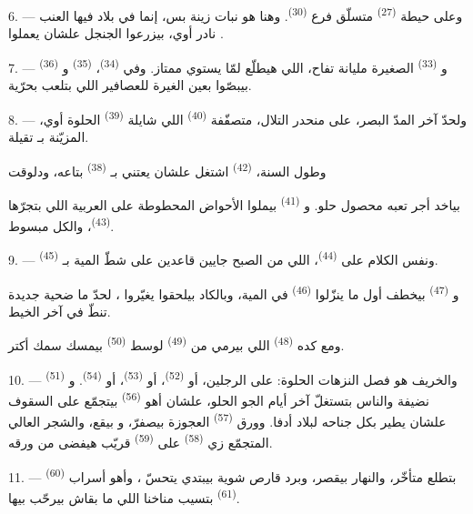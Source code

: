 \VUsaut{6.0mm}
\VUsaut{3.4mm}

6. --- وعلى حيطة  \textsuperscript{(27)} متسلّق فرع 
\textsuperscript{(30)}. وهنا هو نبات زينة بس، إنما في بلاد فيها العنب نادر أوي،
بيزرعوا الجنجل علشان يعملوا .

7. --- و \textsuperscript{(33)} الصغيرة مليانة تفاح، اللي هيطلّع
لمّا يستوي  ممتاز. وفي  \textsuperscript{(34)}،
 \textsuperscript{(35)} و \textsuperscript{(36)}
بيبصّوا بعين الغيرة للعصافير اللي بتلعب بحرّية.

8. --- ولحدّ آخر المدّ البصر، على منحدر التلال، متصفّفة 
\textsuperscript{(40)} اللي شايلة  \textsuperscript{(39)} الحلوة أوي،
المزيّنة بـ تقيلة.

وطول السنة،  \textsuperscript{(42)} اشتغل علشان يعتني
بـ \textsuperscript{(38)} بتاعه، ودلوقت

بياخد أجر تعبه محصول حلو. و \textsuperscript{(41)} بيملوا
الأحواض المحطوطة على العربية اللي بتجرّها  \textsuperscript{(43)}،
والكل مبسوط.

\VUsaut{5.0mm}
\VUsaut{3.4mm}

9. --- ونفس الكلام على  \textsuperscript{(44)}، اللي من
الصبح جايين قاعدين على شطّ المية بـ \textsuperscript{(45)}.

و \textsuperscript{(47)} بيخطف  أول ما ينزّلوا
 \textsuperscript{(46)} في المية، وبالكاد بيلحقوا يغيّروا
، لحدّ ما ضحية جديدة تنطّ في آخر الخيط.

ومع كده  \textsuperscript{(48)} اللي بيرمي 
من  \textsuperscript{(49)} لوسط  \textsuperscript{(50)}
بيمسك سمك أكتر.

10. --- والخريف هو فصل النزهات الحلوة: على الرجلين، أو 
\textsuperscript{(52)}، أو  \textsuperscript{(53)}، أو
 \textsuperscript{(54)}. و \textsuperscript{(51)} نضيفة
والناس بتستغلّ آخر أيام الجو الحلو، علشان أهو  \textsuperscript{(56)}
بيتجمّع على السقوف علشان يطير بكل جناحه لبلاد أدفا. وورق  \textsuperscript{(57)} العجوزة بيصفرّ، و بيقع، والشجر
العالي المتجمّع زي  \textsuperscript{(58)} على 
\textsuperscript{(59)} قريّب هيفضى من ورقه.

11. ---  \textsuperscript{(60)} بتطلع متأخّر، والنهار بيقصر، وبرد
قارص شوية بيبتدي يتحسّ ، وأهو أسراب 
\textsuperscript{(61)} بتسيب مناخنا اللي ما بقاش بيرحّب بيها.

\VUsaut{6.0mm}
\VUfilet{22mm}
